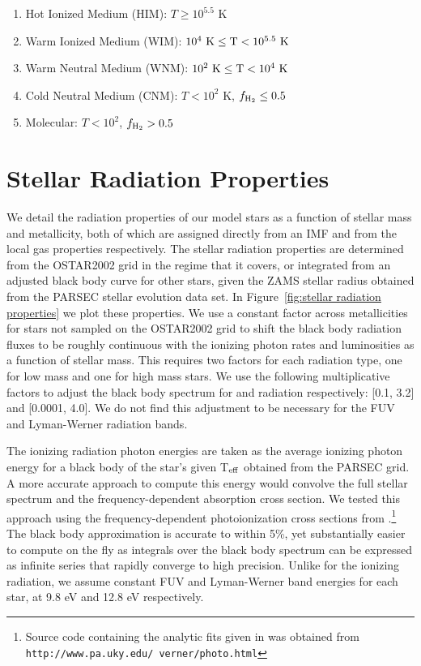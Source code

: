 \documentclass[twocolumn]{aastex61}
\begin{document}
\begin{enumerate}
\item Hot Ionized Medium (HIM): $T \geq 10^{5.5}$ K
\item Warm Ionized Medium (WIM): $10^{4}~\rm{K} \leq T < 10^{5.5}~\rm{K} $
\item Warm Neutral Medium (WNM): $10^{2}~\rm{K} \leq T < 10^{4}~ \rm{K}$
\item Cold Neutral Medium (CNM): $T < 10^2$ K, $f_{\rm H_2} \leq 0.5$
\item Molecular: $T < 10^2$, $f_{\rm H_2} > 0.5$
\end{enumerate}

\section{Stellar Radiation Properties}
\label{appendix:radiation}
We detail the radiation properties of our model stars as a function of stellar mass and metallicity, both of which are assigned directly from an IMF and from the local gas properties respectively. The stellar radiation properties are determined from the OSTAR2002 grid \citep{Lanz2003} in the regime that it covers, or integrated from an adjusted black body curve 
    for other stars,
given the ZAMS stellar radius obtained from the PARSEC \citep{Bressan2012,Tang2014} stellar evolution data set. In Figure~\ref{fig:stellar radiation properties} we plot these properties. We use a constant factor across metallicities for stars not sampled on the OSTAR2002 grid to shift the black body radiation fluxes to be roughly continuous with the ionizing photon rates and luminosities as a function of stellar mass. This requires two factors for each radiation type, one for low mass and one for high mass stars. We use the following multiplicative factors to adjust the black body spectrum for  and  radiation respectively: [0.1, 3.2] and [0.0001, 4.0]. We do not find this adjustment to be necessary for the FUV and Lyman-Werner radiation bands.

The ionizing radiation photon energies are taken as the average ionizing photon energy for a black body of the star's given T$_{\rm eff}$ obtained from the PARSEC grid. A more accurate approach to compute this energy would convolve the full stellar spectrum and the frequency-dependent absorption cross section. We tested this approach using the frequency-dependent photoionization cross sections from \citet{1996ApJ...465..487V}.\footnote{Source code containing the analytic fits given in \citet{1996ApJ...465..487V} was obtained from \texttt{http://www.pa.uky.edu/~verner/photo.html}} The black body approximation is accurate to within 5\%, yet substantially easier to compute on the fly as integrals over the black body spectrum can be expressed as infinite series that rapidly converge to high precision. Unlike for the ionizing radiation, we assume constant FUV and Lyman-Werner band energies for each star, at 9.8 eV and 12.8 eV respectively.
\end{document}
